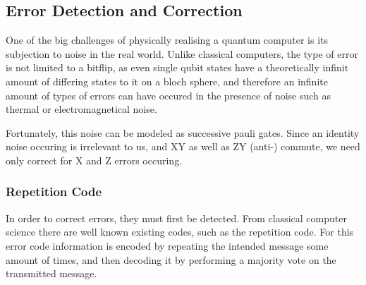 \subsection{Error Detection and Correction}
One of the big challenges of physically realising a quantum 
computer is its subjection to noise in the real world.
Unlike classical computers, the type of error is not limited
to a bitflip, as even single qubit states have a theoretically
infinit amount of differing states to it on a bloch sphere,
and therefore an infinite amount of types of errors can have
occured in the presence of noise such as thermal or electromagnetical
noise.

Fortunately, this noise can be modeled as successive pauli gates.
Since an identity noise occuring is irrelevant to us, and XY as
well as ZY (anti-) commute, we need only correct for X and Z
errors occuring. 

\subsubsection{Repetition Code}
In order to correct errors, they must first be detected.
From classical computer science there are well known existing
codes, such as the repetition code.
For this error code information is encoded by repeating the 
intended message some amount of times, and then decoding it
by performing a majority vote on the transmitted message.

